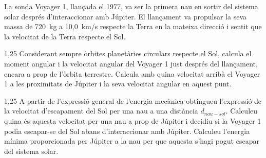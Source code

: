 La sonda Voyager 1, llançada el 1977, va ser la primera nau en sortir del sistema solar després d'interac\-cionar amb Júpiter. El llançament va propulsar la seva massa de 720~kg a 10,0~km/s respecte la Terra en la mateixa direcció i sentit que la velocitat de la Terra respecte el Sol.

\begin{apartat}{1,25}
Considerant sempre òrbites planetàries circulars respecte el Sol, calcula el moment angular i la velocitat angular del Voyager 1 just després del llançament, encara a prop de l'òrbita terrestre. Calcula amb quina velocitat arribà el Voyager 1 a les proximitats de Júpiter i la seva velocitat angular en aquest punt.
\end{apartat}

\begin{apartat}{1,25}
A partir de l'expressió general de l'energia mecànica obtingueu l'expressió de la velocitat d'escapament del Sol per una nau a una distància $d_{nau-sol}$. Calculeu quina és aquesta velocitat per una nau a prop de Júpiter i decidiu si la Voyager 1 podia escapar-se del Sol abans d'interaccionar amb Júpiter. Calculeu l'energia mínima proporcionada per Júpiter a la nau per que aquesta s'hagi pogut escapar del sistema solar.
\end{apartat}

